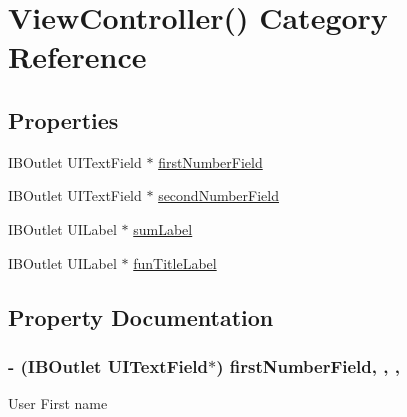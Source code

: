 \hypertarget{category_view_controller_07_08}{}\section{View\+Controller() Category Reference}
\label{category_view_controller_07_08}
\subsection*{Properties}
\begin{DoxyCompactItemize}
\item 
I\+B\+Outlet U\+I\+Text\+Field $\ast$ \hyperlink{category_view_controller_07_08_afdb01433312d6957b5642ead0abcc900}{first\+Number\+Field}
\item 
I\+B\+Outlet U\+I\+Text\+Field $\ast$ \hyperlink{category_view_controller_07_08_a08e26ac06941fdcd69176de116478ceb}{second\+Number\+Field}
\item 
I\+B\+Outlet U\+I\+Label $\ast$ \hyperlink{category_view_controller_07_08_a7436e65d71bab732655bcbe6418255b2}{sum\+Label}
\item 
I\+B\+Outlet U\+I\+Label $\ast$ \hyperlink{category_view_controller_07_08_a1ef022914e2412340ecaaa0b3d1e9211}{fun\+Title\+Label}
\end{DoxyCompactItemize}


\subsection{Property Documentation}
\hypertarget{category_view_controller_07_08_afdb01433312d6957b5642ead0abcc900}{}
\subsubsection[{first\+Number\+Field}]{\setlength{\rightskip}{0pt plus 5cm}-\/ (I\+B\+Outlet U\+I\+Text\+Field$\ast$) first\+Number\+Field\hspace{0.3cm}{\ttfamily [read]}, {\ttfamily [write]}, {\ttfamily [nonatomic]}, {\ttfamily [weak]}}\label{category_view_controller_07_08_afdb01433312d6957b5642ead0abcc900}
User First name \hypertarget{category_view_controller_07_08_a1ef022914e2412340ecaaa0b3d1e9211}{}
